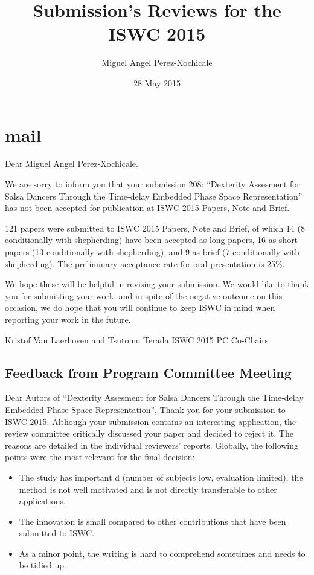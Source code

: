 \documentclass[8pt]{article}
\title{Submission's Reviews for the ISWC 2015}
\author{Miguel Angel Perez-Xochicale}
\date{28 May 2015}
\begin{document}
\maketitle
\linenumbers


\section{mail}

Dear Miguel Angel Perez-Xochicale. 

We are sorry to inform you that your submission 
208: ``Dexterity Assesment for Salsa Dancers Through the Time-delay Embedded Phase Space Representation''
has not been accepted for publication at ISWC 2015 Papers, Note and Brief.

121 papers were submitted to ISWC 2015 Papers, Note and Brief, of which 14 (8 conditionally with shepherding) 
have been accepted as long papers, 16 as short papers (13 conditionally with shepherding), and 
9 as brief (7 conditionally with shepherding). The preliminary acceptance rate for oral presentation is 25\%.

We hope these will be helpful in revising your submission. We would like to thank you for submitting your work, 
and in spite of the negative outcome on this occasion, we do hope that you will continue to keep ISWC in mind 
when reporting your work in the future.

Kristof Van Laerhoven and Tsutomu Terada
ISWC 2015 PC Co-Chairs

\subsection{Feedback from Program Committee Meeting}

   Dear Autors of ``Dexterity Assesment for Salsa Dancers Through the Time-delay Embedded 
Phase Space Representation'',
   Thank you for your submission to ISWC 2015. Although your submission
   contains an interesting application, the review committee critically
   discussed your paper and decided to reject it. The reasons are detailed
   in the individual reviewers' reports. Globally, the following points were
   the most relevant for the final decision:
   
   \begin{itemize}[topsep=0pt,itemsep=-1ex,partopsep=1ex,parsep=1ex]
    \item The study has important d (number of subjects low, evaluation limited),
   the method is not well motivated and is not directly transferable to
   other applications. 
    \item The innovation is small compared to other contributions that have been
   submitted to ISWC.
    \item As a minor point, the writing is hard to comprehend sometimes and needs
   to be tidied up.
   \end{itemize}
\end{document}
